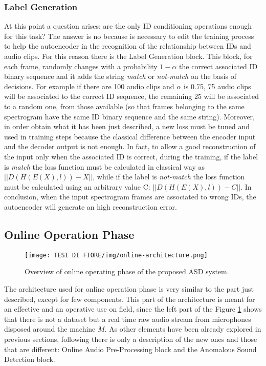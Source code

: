 \subsubsection{Label Generation}
At this point a question arises: are the only ID conditioning operations enough for this task? The answer is no because is necessary to edit the training process to help the autoencoder in the recognition of the relationship between IDs and audio clips. For this reason there is the Label Generation block. This block, for each frame, randomly changes with a probability $1-\alpha$ the correct associated ID binary sequence and it adds the string \textit{match} or \textit{not-match} on the basis of decisions. For example if there are 100 audio clips and $\alpha$ is 0.75, 75 audio clips will be associated to the correct ID sequence, the remaining 25 will be associated to a random one, from those available (so that frames belonging to the same spectrogram have the same ID binary sequence and the same string). Moreover, in order obtain what it has been just described, a new loss must be tuned and used in training steps because the classical difference between the encoder input and the decoder output is not enough. In fact, to allow a good reconstruction of the input only when the associated ID is correct, during the training, if the label is \textit{match} the loss function must be calculated in classical way as $||D(H(E(X),l)) - X||$,
while if the label is \textit{not-match} the loss function must be calculated using an arbitrary value C: $||D(H(E(X),l)) - C||$.
In conclusion, when the input spectrogram frames are associated to wrong IDs, the autoencoder will generate an high reconstruction error.
\subsection{Online Operation Phase}
\begin{figure}[ht]
\texttt{[image: TESI DI FIORE/img/online-architecture.png]}
\centering
\caption{Overview of online operating phase of the proposed ASD system.}
\label{online-asd-system}
\end{figure}
The architecture used for online operation phase is very similar to the part just described, except for few components. This part of the architecture is meant for an effective and an operative use on field, since the left part of the Figure \ref{online-asd-system} shows that there is not a dataset but a real time raw audio stream from microphones disposed around the machine $M$. As other elements have been already explored in previous sections, following  there is only a description of the new ones and those that are different: Online Audio Pre-Processing block and the Anomalous Sound Detection block. 
